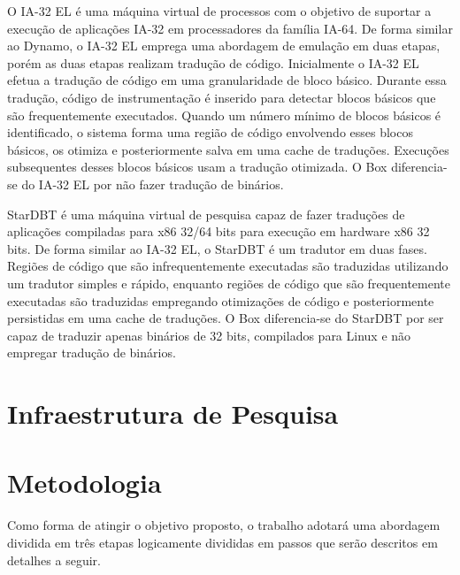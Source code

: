 \documentclass[11pt,twoside]{article}
\begin{document}
O IA-32 EL \cite{Baraz2003} é uma máquina virtual de processos com o objetivo de suportar a execução de aplicações IA-32 em processadores da família IA-64.
De forma similar ao Dynamo, o IA-32 EL emprega uma abordagem de emulação em duas etapas, porém as duas etapas realizam tradução de código. 
Inicialmente o IA-32 EL efetua a tradução de código em uma granularidade de bloco básico.
Durante essa tradução, código de instrumentação é inserido para detectar blocos básicos que são frequentemente executados. 
Quando um número mínimo de blocos básicos é identificado, o sistema forma uma região de código envolvendo esses blocos básicos, os otimiza e posteriormente salva em uma cache de traduções. 
Execuções subsequentes desses blocos básicos usam a tradução otimizada. 
O Box diferencia-se do IA-32 EL por não fazer tradução de binários.

StarDBT \cite{Wang2007} é uma máquina virtual de pesquisa capaz de fazer traduções de aplicações compiladas para x86 32/64 bits para execução em hardware x86 32 bits.
De forma similar ao IA-32 EL, o StarDBT é um tradutor em duas fases. 
Regiões de código que são infrequentemente executadas são traduzidas utilizando um tradutor simples e rápido, enquanto regiões de código que são frequentemente executadas são traduzidas empregando otimizações de código e posteriormente persistidas em uma cache de traduções. 
O Box diferencia-se do StarDBT por ser capaz de traduzir apenas binários de 32 bits, compilados para Linux e não empregar tradução de binários.

\section{Infraestrutura de Pesquisa}
%

\section{Metodologia}
%

Como forma de atingir o objetivo proposto, o trabalho adotará uma abordagem dividida em três etapas logicamente divididas em passos que serão descritos em detalhes a seguir.
\end{document}
